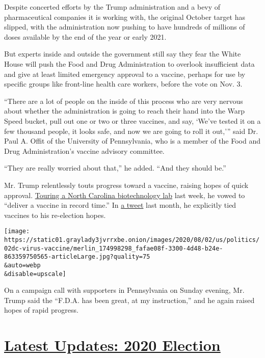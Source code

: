 Despite concerted efforts by the Trump administration and a bevy of
pharmaceutical companies it is working with, the original October target
has slipped, with the administration now pushing to have hundreds of
millions of doses available by the end of the year or early 2021.

But experts inside and outside the government still say they fear the
White House will push the Food and Drug Administration to overlook
insufficient data and give at least limited emergency approval to a
vaccine, perhaps for use by specific groups like front-line health care
workers, before the vote on Nov. 3.

``There are a lot of people on the inside of this process who are very
nervous about whether the administration is going to reach their hand
into the Warp Speed bucket, pull out one or two or three vaccines, and
say, `We've tested it on a few thousand people, it looks safe, and now
we are going to roll it out,''' said Dr. Paul A. Offit of the University
of Pennsylvania, who is a member of the Food and Drug Administration's
vaccine advisory committee.

``They are really worried about that,'' he added. ``And they should
be.''

Mr. Trump relentlessly touts progress toward a vaccine, raising hopes of
quick approval.
\href{https://www.nytimes3xbfgragh.onion/video/us/100000007258794/trump-boasts-vaccine-progress-north-carolina.html}{Touring
a North Carolina biotechnology lab} last week, he vowed to ``deliver a
vaccine in record time.'' In
\href{https://twitter.com/realdonaldtrump/status/1283566319405797378}{a
tweet} last month, he explicitly tied vaccines to his re-election hopes.

\texttt{[image: https://static01.graylady3jvrrxbe.onion/images/2020/08/02/us/politics/02dc-virus-vaccine/merlin\_174998298\_fafae08f-3300-4d48-b24e-863359750565-articleLarge.jpg?quality=75\\\&auto=webp\\\&disable=upscale]}

On a campaign call with supporters in Pennsylvania on Sunday evening,
Mr. Trump said the ``F.D.A. has been great, at my instruction,'' and he
again raised hopes of rapid progress.

\hypertarget{latest-updates-2020-election}{%
\section{\texorpdfstring{\href{https://www.nytimes3xbfgragh.onion/2020/08/04/us/elections/primary-election-michigan-arizona-kansas.html?action=click\&pgtype=Article\&state=default\&region=MAIN_CONTENT_1\&context=storylines_live_updates}{Latest
Updates: 2020
Election}}{Latest Updates: 2020 Election}}\label{latest-updates-2020-election}}

